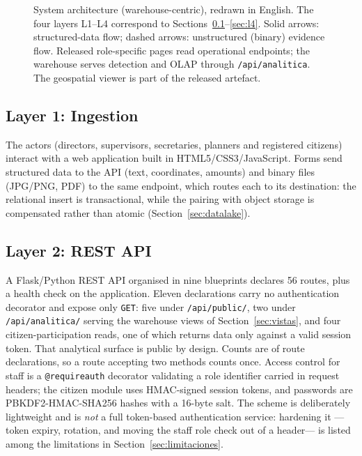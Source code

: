 \documentclass[runningheads]{llncs}
\renewcommand{\_}{\origunderscore\allowbreak}
\begin{document}
\begin{figure}[htbp]
{}
\caption{System architecture (warehouse-centric), redrawn in English. The four
layers L1--L4 correspond to Sections~\ref{sec:l1}--\ref{sec:l4}. Solid arrows: structured-data
flow; dashed arrows: unstructured (binary) evidence flow. Released role-specific
pages read operational endpoints; the warehouse serves detection and OLAP through
\texttt{/api/analitica}. The geospatial viewer is part of the released artefact.}
\label{fig:arquitectura}
\end{figure}

\subsection{Layer 1: Ingestion}
\label{sec:l1}
The actors (directors, supervisors, secretaries, planners and registered citizens) interact with a web application built in HTML5/CSS3/JavaScript. Forms send structured data to the API (text, coordinates, amounts) and binary files (JPG/PNG, PDF) to the same endpoint, which routes each to its destination: the relational insert is transactional, while the pairing with object storage is compensated rather than atomic (Section~\ref{sec:datalake}).

\subsection{Layer 2: REST API}
\label{sec:l2}
\begingroup
A Flask/Python REST API organised in nine blueprints declares 56 routes, plus a health check on the application. Eleven declarations carry no authentication decorator and expose only \texttt{GET}: five under \texttt{/api/pub\-lic/}, two under \texttt{/api/ana\-li\-ti\-ca/} serving the warehouse views of Section~\ref{sec:vistas}, and four citizen-participation reads, one of which returns data only against a valid session token. That analytical surface is public by design. Counts are of route declarations, so a route accepting two methods counts once. Access control for staff is a \texttt{@require\_auth} decorator validating a role identifier carried in request headers; the citizen module uses HMAC-signed session tokens, and passwords are PBKDF2-HMAC-SHA256 hashes with a 16-byte salt. The scheme is deliberately lightweight and is \emph{not} a full token-based authentication service: hardening it ---token expiry, rotation, and moving the staff role check out of a header--- is listed among the limitations in Section~\ref{sec:limitaciones}.
\endgroup
\end{document}
